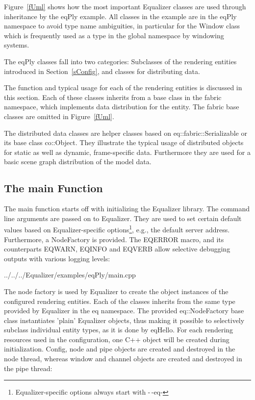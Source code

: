 \documentclass[10pt,a4]{scrartcl}
\newcommand{\fig}[1]{Figure~\ref{#1}}
\newcommand{\sref}[1]{Section~\ref{#1}}
\begin{document}
\fig{fUml} shows how the most important Equalizer classes are used through
inheritance by the \textsf{eqPly} example. All classes in the example are in the
\textsf{eqPly} namespace to avoid type name ambiguities, in particular for the
\textsf{Window} class which is frequently used as a type in the global namespace
by windowing systems.

The \textsf{eqPly} classes fall into two categories: Subclasses of the
rendering entities introduced in \sref{sConfig}, and classes for
distributing data.

The function and typical usage for each of the rendering entities is discussed
in this section. Each of these classes inherits from a base class in the
\textsf{fabric} name\-space, which implements data distribution for the
entity. The fabric base classes are omitted in \fig{fUml}.

The distributed data classes are helper classes based on
\textsf{eq::fabric::Serializable} or its base class \textsf{co::Object}. They
illustrate the typical usage of distributed objects for static as well as
dynamic, frame-specific data. Furthermore they are used for a basic scene graph
distribution of the model data.


\subsection{The main Function}

The main function starts off with initializing the Equalizer library. The
command line arguments are passed on to Equalizer. They are used to set certain
default values based on Equalizer-specific options\footnote{Equalizer-specific
  options always start with -\,-eq-}, e.g., the default server
address. Furthermore, a \textsf{NodeFactory} is provided. The \textsf{EQERROR}
macro, and its counterparts \textsf{EQWARN}, \textsf{EQINFO} and \textsf{EQVERB}
allow selective debugging outputs with various logging levels:

{\footnotesize
  {../../../Equalizer/examples/eqPly/main.cpp}}

The node factory is used by Equalizer to create the object instances of
the configured rendering entities. Each of the classes inherits from the
same type provided by Equalizer in the \textsf{eq} namespace. The
provided \textsf{eq::NodeFactory} base class instantiates 'plain'
Equalizer objects, thus making it possible to selectively subclass
individual entity types, as it is done by \textsf{eqHello}. For each
rendering resources used in the configuration, one C++ object will be
created during initialization. Config, node and pipe objects are created and
destroyed in the node thread, whereas window and channel objects are
created and destroyed in the pipe thread:
\end{document}
